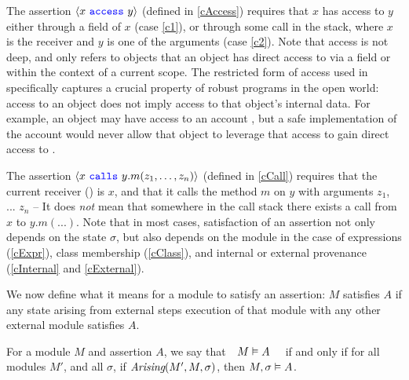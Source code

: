  
The assertion ${\langle x\ {\color{blue}\texttt{access}}\ y \rangle}$ (defined in  \ref{cAccess})
requires  that $x$ has access to $y$
either through a field of $x$ (case \ref{c1}),
or through some call in the stack, where $x$ is the receiver and $y$ is one of the
arguments (case \ref{c2}).
{Note that access is not deep, and only refers to objects that 
an object has direct access to via a field or within the context of a current scope. 
 The restricted form of access used in \Nec specifically captures a crucial property of robust programs in the open world: access to an object does not imply access to that object's internal data. For example, an object may have access to an account , but a safe implementation of the account would never allow that object to leverage that access to gain direct access to {}}.
 
 The assertion %
 ${\langle x\ {\color{blue}\texttt{calls}}\ y.m(z_1, \ldots, z_n) \rangle}$  (defined in \ref{cCall}) 
requires that the current receiver () is $x$, and that it calls the method $m$ on $y$ with
 arguments $z_1$, ... $z_n$ -- It does \emph{not} mean  that somewhere in the 
 call stack there exists a call from $x$ to $y.m(...)$. 
 Note that in most cases, satisfaction of an assertion not only depends on the state $\sigma$, but 
also depends on the module in the case of expressions (\ref{cExpr}), class membership
(\ref{cClass}), and internal or external provenance (\ref{cInternal} and \ref{cExternal}).


We now define what it means for a module to satisfy an assertion:
 $M$ satisfies  $A$ if any state arising from external steps execution of that
module with any other external module  satisfies $A$. 
 
\begin{definition}  
\label{def:mdl-sat}
For a module $M$ and assertion $A$, we say that\ \  $M \vDash A$ \ \ if and only if 
for all modules $M'$, and all $\sigma$, if $\textit{Arising}(M', M, \sigma)$, then $M , \sigma \vDash A$.
\end{definition}

